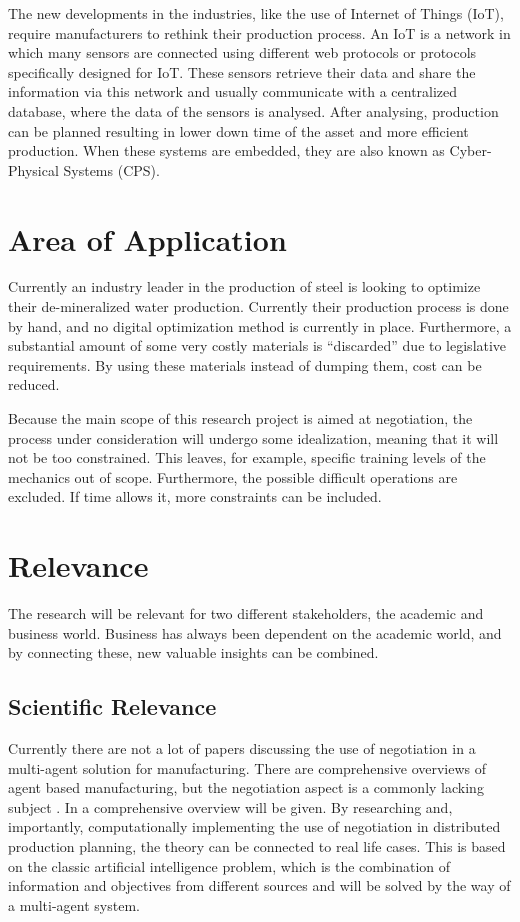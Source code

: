 \begin{mdframed}[style=mystyle, frametitle=IoT and CPS]

	The new developments in the industries, like the use of Internet of Things (IoT), require manufacturers to rethink their production process. An IoT is a network in which many sensors are connected using different web protocols or protocols specifically designed for IoT. These sensors retrieve their data and share the information via this network and usually communicate with a centralized database, where the data of the sensors is analysed. After analysing, production can be planned resulting in lower down time of the asset and more efficient production. When these systems are embedded, they are also known as Cyber-Physical Systems (CPS).
\end{mdframed}


\section{Area of Application}

Currently an industry leader in the production of steel is looking to optimize their de-mineralized water production. Currently their production process is done by hand, and no digital optimization method is currently in place. Furthermore, a substantial amount of some very costly materials is ``discarded'' due to legislative requirements. By using these materials instead of dumping them, cost can be reduced.

Because the main scope of this research project is aimed at negotiation, the process under consideration will undergo some idealization, meaning that it will not be too constrained. This leaves, for example, specific training levels of the mechanics out of scope. Furthermore, the possible difficult operations are excluded.  If time allows it, more constraints can be included.


\section{Relevance}%
The research will be relevant for two different stakeholders, the academic and business world. Business has always been dependent on the academic world, and by connecting these, new valuable insights can be combined.
\subsection{Scientific Relevance}
Currently there are not a lot of papers discussing the use of negotiation in a multi-agent solution for manufacturing. There are comprehensive overviews of agent based manufacturing, but the negotiation aspect is a commonly lacking subject \citep{leitao2009agent}. In  a comprehensive overview will be given. By researching and, importantly, computationally implementing the use of negotiation in distributed production planning, the theory can be connected to real life cases. This is based on the classic artificial intelligence problem, which is the combination of information and objectives from different sources and will be solved by the way of a multi-agent system.

